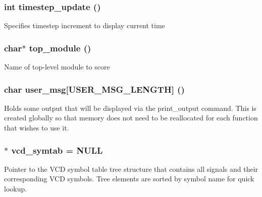 \subsubsection{\setlength{\rightskip}{0pt plus 5cm}int {\bf timestep\_\-update} ()}\label{db_8c_a10}


Specifies timestep increment to display current time 
\subsubsection{\setlength{\rightskip}{0pt plus 5cm}char$\ast$ {\bf top\_\-module} ()}\label{db_8c_a0}


Name of top-level module to score 
\subsubsection{\setlength{\rightskip}{0pt plus 5cm}char {\bf user\_\-msg}[USER\_\-MSG\_\-LENGTH] ()}\label{db_8c_a6}


Holds some output that will be displayed via the print\_\-output command. This is created globally so that memory does not need to be reallocated for each function that wishes to use it. 
\subsubsection{$\ast$ {\bf vcd\_\-symtab} = NULL}\label{db_8c_a17}


Pointer to the VCD symbol table tree structure that contains all signals and their corresponding VCD symbols. Tree elements are sorted by symbol name for quick lookup. 